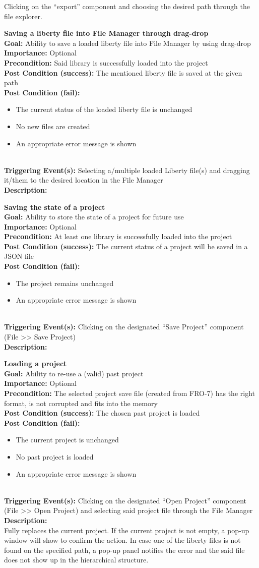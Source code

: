 \documentclass[10pt,a4paper]{report}
\newcommand{\precondition}[1]{
    \textbf{Precondition: } #1 \leavevmode \\
}
\newcommand{\FRODescription}[8]{
    \textbf{#1} \leavevmode \\
    \textbf{Goal: } #2 \leavevmode \\
    \textbf{Importance: } #3 \leavevmode \\
    \precondition{#4}
    \textbf{Post Condition (success): } #5 \leavevmode \\
    \textbf{Post Condition (fail): } #6 \leavevmode \\
    \textbf{Triggering Event(s): } #7 \leavevmode \\
    \textbf{Description: } \leavevmode \\
    #8}
\begin{document}
\begin{FRO}
{\begin{itemize}
    \end{itemize}}
    {Clicking on the “export” component and choosing the desired path through the file explorer.}
    \item \FRODescription{Saving a liberty file into File Manager through drag-drop}
    {Ability to save a loaded liberty file into File Manager by using drag-drop}
    {Optional}
    {Said library is successfully loaded into the project}
    {The mentioned liberty file is saved at the given path}
    {\begin{itemize}
        \item The current status of the loaded liberty file is unchanged
        \item No new files are created
        \item An appropriate error message is shown
    \end{itemize}}
    {Selecting a/multiple loaded Liberty file(s) and dragging it/them to the desired location in the File Manager}
    \item \FRODescription{Saving the state of a project}
    {Ability to store the state of a project for future use}
    {Optional}
    {At least one library is successfully loaded into the project}
    {The current status of a project will be saved in a JSON file}
    {\begin{itemize}
        \item The project remains unchanged
        \item An appropriate error message is shown
    \end{itemize}}
    {Clicking on the designated “Save Project” component (File >> Save Project)}
    \item \FRODescription{Loading a project}
    {Ability to re-use a (valid) past project}
    {Optional}
    {The selected project save file (created from FRO-7) has the right format, is not corrupted and fits into the memory}
    {The chosen past project is loaded}
    {\begin{itemize}
        \item The current project is unchanged
        \item No past project is loaded
        \item An appropriate error message is shown
    \end{itemize}}
    {Clicking on the designated “Open Project” component (File >> Open Project) and selecting said project file through the File Manager}
    {Fully replaces the current project. If the current project is not empty, a pop-up window will show to confirm the action. In case one of the liberty files is not found on the specified path, a pop-up panel notifies the error and the said file does not show up in the hierarchical structure.}

\end{FRO}
\end{document}
